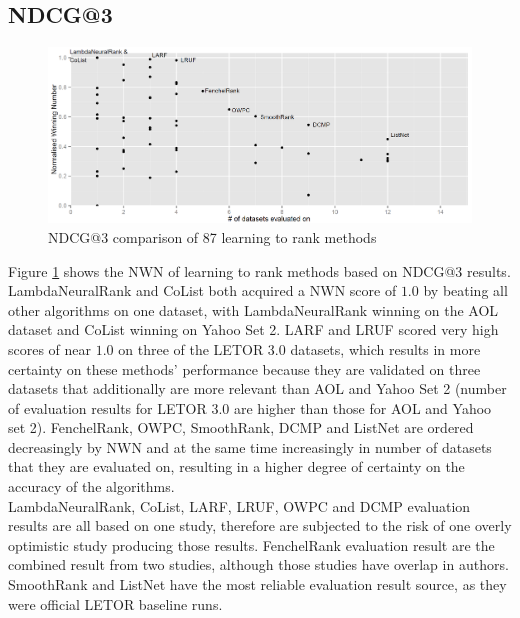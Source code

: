 \documentclass[english, authoryear, preprint]{elsarticle}
\begin{document}
\subsection{NDCG@3}
\begin{figure}
\centering
\includegraphics[scale=0.26]{gfx/ndcg3_winnum}
\caption{NDCG@3 comparison of 87 learning to rank methods}
\label{fig:normalized_winning_number_ndcg3}
\end{figure}
Figure \ref{fig:normalized_winning_number_ndcg3} shows the NWN of learning to rank methods based on NDCG@3 results. LambdaNeuralRank and CoList both acquired a NWN score of $1.0$ by beating all other algorithms on one dataset, with LambdaNeuralRank winning on the AOL dataset and CoList winning on Yahoo Set 2. LARF and LRUF scored very high scores of near $1.0$ on three of the LETOR 3.0 datasets, which results in more certainty on these methods' performance because they are validated on three datasets that additionally are more relevant than AOL and Yahoo Set 2 (number of evaluation results for LETOR 3.0 are higher than those for AOL and Yahoo set 2). FenchelRank, OWPC, SmoothRank, DCMP and ListNet are ordered decreasingly by NWN and at the same time increasingly in number of datasets that they are evaluated on, resulting in a higher degree of certainty on the accuracy of the algorithms.\\

LambdaNeuralRank, CoList, LARF, LRUF, OWPC and DCMP evaluation results are all based on one study, therefore are subjected to the risk of one overly optimistic study producing those results. FenchelRank evaluation result are the combined result from two studies, although those studies have overlap in authors. SmoothRank and ListNet have the most reliable evaluation result source, as they were official LETOR baseline runs.  
\end{document}
